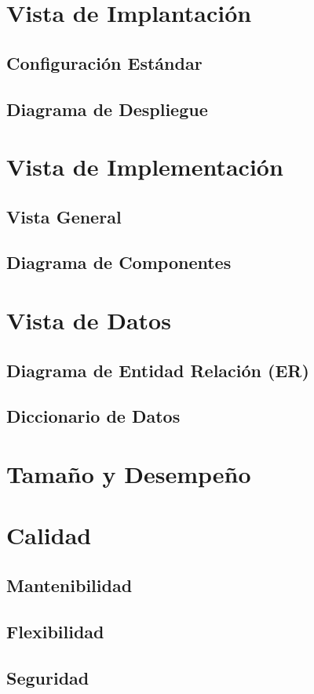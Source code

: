 \documentclass{article}
\begin{document}
    \section{Vista de Implantación} \label{vistaImplantacion}
    \subsection{Configuración Estándar}
    \subsection{Diagrama de Despliegue}


    \section{Vista de Implementación} \label{vistaImplementacion}
    \subsection{Vista General}
    \subsection{Diagrama de Componentes}


    \section{Vista de Datos} \label{vistaDatos}
    \subsection{Diagrama de Entidad Relación (ER)}
    \subsection{Diccionario de Datos}


    \section{Tamaño y Desempeño} \label{tamDesemp}

    \section{Calidad}
    \subsection{Mantenibilidad}
    \subsection{Flexibilidad}
    \subsection{Seguridad}
\end{document}
